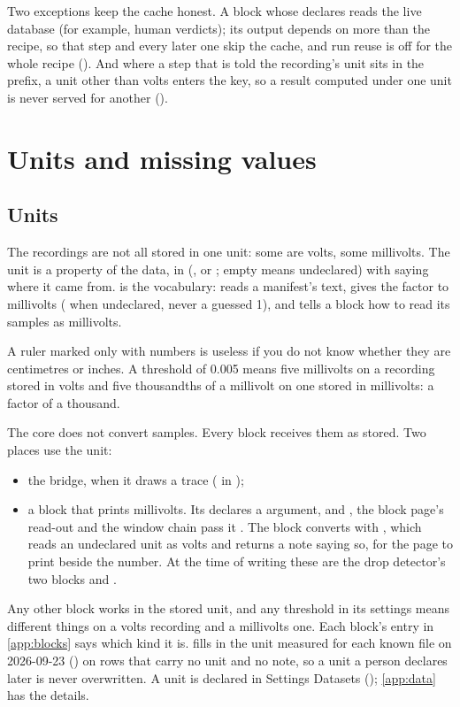 Two exceptions keep the cache honest. A block whose  declares  reads the live
database (for example, human verdicts); its output depends on more than the recipe, so that step
and every later one skip the cache, and run reuse is off for the whole recipe
(). And where a step that is told the recording's unit sits in the
prefix, a unit other than volts enters the key, so a result computed under one unit is never served
for another ().

\section{Units and missing values}\label{sec:architecture-units}
\subsection{Units}
The recordings are not all stored in one unit: some are volts, some millivolts. The unit is a
property of the data, in  (,  or ; empty means
undeclared) with  saying where it came from.  is
the vocabulary:  reads a manifest's text,  gives the factor to
millivolts ( when undeclared, never a guessed 1), and  tells a block how
to read its samples as millivolts.

\begin{plainterms}
A ruler marked only with numbers is useless if you do not know whether they are centimetres or
inches. A threshold of 0.005 means five millivolts on a recording stored in volts and five
thousandths of a millivolt on one stored in millivolts: a factor of a thousand.
\end{plainterms}

The core does not convert samples. Every block receives them as stored. Two places use the unit:
\begin{itemize}
\item the bridge, when it draws a trace ( in );
\item a block that prints millivolts. Its  declares a  argument, and
  , the block page's read-out and the window chain pass it
  . The block converts with , which reads an undeclared unit
  as volts and returns a note saying so, for the page to print beside the number. At the time of
  writing these are the drop detector's two blocks and .
\end{itemize}
Any other block works in the stored unit, and any threshold in its settings means different things
on a volts recording and a millivolts one. Each block's entry in \cref{app:blocks} says which kind it
is.  fills in the unit measured for each known file on 2026-09-23
() on rows that carry no unit and no note, so a unit a person
declares later is never overwritten. A unit is declared in Settings \textrightarrow{} Datasets
(); \cref{app:data} has the details.

